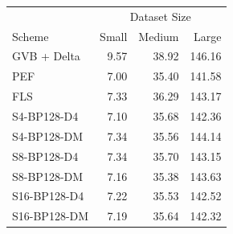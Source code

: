 \begin{tabular}{lrrr}
\toprule
 & \multicolumn{3}{c}{Dataset Size} \\
Scheme & Small & Medium & Large \\
\midrule
GVB + Delta & 9.57 & 38.92 & 146.16 \\
PEF & 7.00 & 35.40 & 141.58 \\
FLS & 7.33 & 36.29 & 143.17 \\
S4-BP128-D4 & 7.10 & 35.68 & 142.36 \\
S4-BP128-DM & 7.34 & 35.56 & 144.14 \\
S8-BP128-D4 & 7.34 & 35.70 & 143.15 \\
S8-BP128-DM & 7.16 & 35.38 & 143.63 \\
S16-BP128-D4 & 7.22 & 35.53 & 142.52 \\
S16-BP128-DM & 7.19 & 35.64 & 142.32 \\
\bottomrule
\end{tabular}
